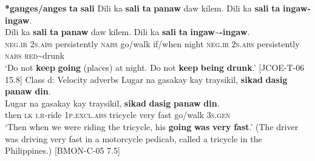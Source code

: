 \textbf{*ganges/anges} \textbf{ta} \textbf{sali}
\z
\ea
\label{bkm:Ref113431626}
Dili  ka  \textbf{sali}  \textbf{ta}  \textbf{panaw}  daw  kilem.  Dili  ka  \textbf{sali} \textbf{ta}  \textbf{ingaw-ingaw}. \\\smallskip
 \gll Dili  ka  \textbf{sali}  \textbf{ta}  \textbf{panaw}  daw  kilem.  Dili  ka  \textbf{sali} \textbf{ta}  \textbf{ingaw\sim{}-ingaw}. \\
\textsc{neg.ir}  2\textsc{s.abs}  persistently  \textsc{nabs}  go/walk  if/when  night  \textsc{neg.ir}  2\textsc{s.abs}  persistently \textsc{nabs}  \textsc{red}\sim{}drunk \\
\glt `Do not \textbf{keep} \textbf{going} (places) at night. Do not \textbf{keep} \textbf{being} \textbf{drunk}.’ [JCOE-T-06 15.8]
\z
Class d: Velocity adverbs
\ea
\label{bkm:Ref113431770}
Lugar  na  gasakay  kay  traysikil,  \textbf{sikad}  \textbf{dasig}  \textbf{panaw}  \textbf{din}. \\\smallskip
 \gll Lugar  na  gasakay  kay  traysikil,  \textbf{sikad}  \textbf{dasig}  \textbf{panaw}  \textbf{din}. \\
then  \textsc{lk}  \textsc{i.r}-ride  1\textsc{p.excl.abs}  tricycle  very  fast  go/walk  3\textsc{s.gen} \\
\glt ‘Then when we were riding the tricycle, his \textbf{going} \textbf{was} \textbf{very} \textbf{fast}.’ (The driver was driving very fast in a motorcycle pedicab, called a tricycle in the Philippines.) [BMON-C-05 7.5] \\\smallskip

